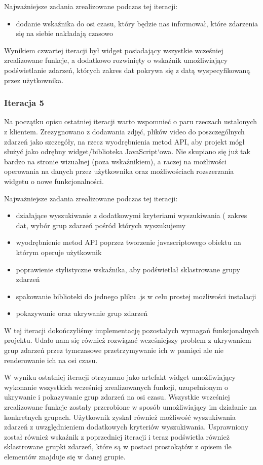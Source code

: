 \documentclass[polish,12pt]{aghthesis}
\begin{document}
Najważniejsze zadania zrealizowane podczas tej iteracji:
\begin{itemize}
	\item dodanie wskaźnika do osi czasu, który będzie nas informował, które zdarzenia się na siebie nakładają czasowo
\end{itemize}

Wynikiem czwartej iteracji był widget posiadający wszystkie wcześniej zrealizowane funkcje, a dodatkowo rozwinięty o wskaźnik umożliwiający podświetlanie zdarzeń, których zakres dat pokrywa się z datą wyspecyfikowaną przez użytkownika. 

\subsubsection{Iteracja 5}

Na początku opisu ostatniej iteracji warto wspomnieć o paru rzeczach ustalonych z klientem.
Zrezygnowano z dodawania zdjęć, plików video do poszczególnych zdarzeń jako szczegóły, na rzecz wyodrębnienia metod API, aby projekt mógł służyć jako odrębny widget/biblioteka JavaScript`owa. Nie skupiano się już tak bardzo na stronie wizualnej (poza wskaźnikiem), a raczej na możliwości operowania na danych przez użytkownika oraz możliwościach rozszerzania widgetu o nowe funkcjonalności.

Najważniejsze zadania zrealizowane podczas tej iteracji:

\begin{itemize}
	\item działające wyszukiwanie z dodatkowymi kryteriami wyszukiwania ( zakres dat, wybór grup zdarzeń pośród których wyszukujemy 
	\item wyodrębnienie metod API poprzez tworzenie javascriptowego obiektu na którym operuje użytkownik
	\item poprawienie stylistyczne wskaźnika, aby podświetlał sklastrowane grupy zdarzeń
	\item spakowanie biblioteki do jednego pliku .js w celu prostej możliwości instalacji
	\item pokazywanie oraz ukrywanie grup zdarzeń
\end{itemize}

W tej iteracji dokończyliśmy implementację pozostałych wymagań funkcjonalnych projektu.
Udało nam się również rozwiązać wcześniejszy problem z ukrywaniem grup zdarzeń przez tymczasowe przetrzymywanie ich w pamięci ale nie renderowanie ich na osi czasu.

W wyniku ostatniej iteracji otrzymano jako artefakt widget umożliwiający wykonanie wszystkich wcześniej zrealizowanych funkcji, uzupełnionym o ukrywanie i pokazywanie grup zdarzeń na osi czasu. Wszystkie wcześniej zrealizowane funkcje zostały przerobione w sposób umożliwiający im działanie na konkretnych grupach. Użytkownik zyskał również możliwość wyszukiwania zdarzeń z uwzględnieniem dodatkowych kryteriów wyszukiwania. Usprawniony został również wskaźnik z poprzedniej iteracji i teraz podświetla również sklastrowane grupki zdarzeń, które są w postaci prostokątów z opisem ile elementów znajduje się w danej grupie. 
\end{document}
